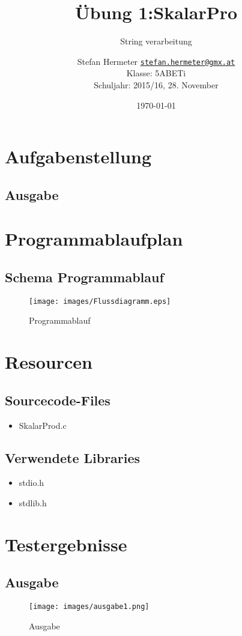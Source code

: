 \documentclass{scrartcl}
\newcommand{\mytitle}{Übung 1}
\begin{document}
\title{\mytitle:SkalarPro}
\subtitle{String verarbeitung}
\date{\today}
\author{Stefan Hermeter \texttt{\href{mailto:stefan.hermeter@gmx.at}{stefan.hermeter@gmx.at}}\\
  Klasse: 5ABETi\\
  Schuljahr: 2015/16, 28. November}
\maketitle
{}
\newpage
\tableofcontents
\listoffigures
\newpage
{}
\section{Aufgabenstellung}

\subsection{Ausgabe}

\section{Programmablaufplan}
\subsection{Schema Programmablauf}
\begin{figure}[H]
  \centering
  \texttt{[image: images/Flussdiagramm.eps]}
  \caption{Programmablauf}
  \label{fig:digraph}
\end{figure}

\section{Resourcen}

\subsection{Sourcecode-Files}
\begin{itemize}
\item SkalarProd.c
\end{itemize}

\subsection{Verwendete Libraries}
\begin{itemize}
\item stdio.h
\item stdlib.h
\end{itemize}

\section{Testergebnisse}
\subsection{Ausgabe}
\begin{figure}[H]
  \centering
  \texttt{[image: images/ausgabe1.png]}
  \caption{Ausgabe}
  \label{fig:digraph}
\end{figure} 
\end{document}

